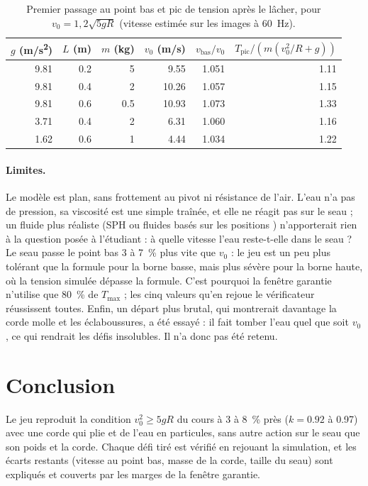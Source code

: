 \begin{table}[!htb]
  \centering
  \small
  \begin{tabular}{rrrrrr}
    \toprule
    \(g\) (\si{m/s^2}) & \(L\) (\si{m}) & \(m\) (\si{kg}) & \(v_0\) (\si{m/s}) & \(v_{\text{bas}}/v_0\) & \(T_{\text{pic}}/\left(m (v_0^2/R + g)\right)\) \\
    \midrule
    \num{9,81} & \num{0,2} & 5   & \num{9,55}  & \num{1,051} & \num{1,11} \\
    \num{9,81} & \num{0,4} & 2   & \num{10,26} & \num{1,057} & \num{1,15} \\
    \num{9,81} & \num{0,6} & \num{0,5} & \num{10,93} & \num{1,073} & \num{1,33} \\
    \num{3,71} & \num{0,4} & 2   & \num{6,31}  & \num{1,060} & \num{1,16} \\
    \num{1,62} & \num{0,6} & 1   & \num{4,44}  & \num{1,034} & \num{1,22} \\
    \bottomrule
  \end{tabular}
  \caption{Premier passage au point bas et pic de tension après le lâcher, pour
    \(v_0 = 1{,}2 \sqrt{5 g R}\) (vitesse estimée sur les images à
    \SI{60}{Hz}).}
  \label{tab-tours}
\end{table}

\paragraph{Limites.} Le modèle est plan, sans frottement au pivot ni résistance
de l'air. L'eau n'a pas de pression, sa viscosité est une simple traînée, et
elle ne réagit pas sur le seau ; un fluide plus réaliste (SPH ou fluides basés
sur les positions \cite{monaghan1992sph, macklin2013pbf}) n'apporterait rien à
la question posée à l'étudiant : à quelle vitesse l'eau reste-t-elle dans le
seau ? Le seau passe le point bas 3 à \SI{7}{\percent} plus vite que \(v_0\) :
le jeu est un peu plus tolérant que la formule pour la borne basse, mais plus
sévère pour la borne haute, où la tension simulée dépasse la formule. C'est
pourquoi la fenêtre garantie n'utilise que \SI{80}{\percent} de \(T_{\max}\) ;
les cinq valeurs qu'en rejoue le vérificateur réussissent toutes. Enfin,
un départ plus brutal, qui montrerait davantage la corde molle et les
éclaboussures, a été essayé : il fait tomber l'eau quel que soit \(v_0\), ce qui
rendrait les défis insolubles. Il n'a donc pas été retenu.


\FloatBarrier

\section{Conclusion}

Le jeu reproduit la condition \(v_0^2 \geq 5 g R\) du cours à 3 à
\SI{8}{\percent} près (\(k = \num{0,92}\) à \num{0,97}) avec une corde qui plie
et de l'eau en particules, sans autre action sur le seau que son poids et la
corde. Chaque défi tiré est vérifié en rejouant la simulation, et les écarts
restants (vitesse au point bas, masse de la corde, taille du seau) sont
expliqués et couverts par les marges de la fenêtre garantie.

